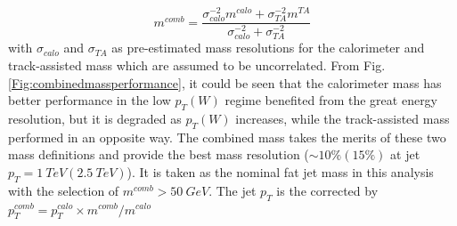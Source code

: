\begin{equation}
m^{comb} = \frac{\sigma_{{calo}}^{-2} m^{{calo}} + \sigma_{{TA}}^{-2} m^{{TA}} }{\sigma_{{calo}}^{-2} + \sigma_{{TA}}^{-2}}
\end{equation}
with $\sigma_{{calo}}$ and $\sigma_{{TA}}$ as pre-estimated mass resolutions for  the calorimeter and track-assisted mass which are assumed to be uncorrelated. From Fig. \ref{Fig:combinedmassperformance}, it could be seen that the calorimeter mass has better performance in the low $p_{T}(W)$ regime benefited from the great energy resolution, but it is degraded as $p_{T}(W)$ increases, while the track-assisted mass performed in an opposite way. The combined mass takes the merits of these two mass definitions and provide the best mass resolution ($\sim10\% (15\%)$ at jet $p_{T}=1~TeV(2.5~TeV)$). It is taken as the nominal fat jet mass in this analysis with the selection of $m^{comb}>50~GeV$. The jet $p_{T}$ is the corrected by $p_{T}^{comb}=p_{T}^{calo}\times m^{comb}/m^{calo}$ 

